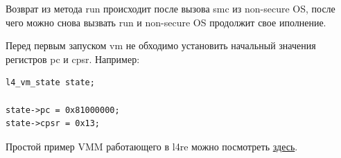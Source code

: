 \documentclass[11pt]{article}
\begin{document}
Возврат из метода run происходит после вызова smc из non-secure OS, после чего можно
снова вызвать run и non-secure OS продолжит свое иполнение.

Перед первым запуском vm не обходимо установить начальный значения регистров pc и 
cpsr. Например:
\begin{verbatim}
l4_vm_state state;

state->pc = 0x81000000;
state->cpsr = 0x13;
\end{verbatim}

Простой пример VMM работающего в l4re можно посмотреть \href{https://github.com/decaprox/l4re-snapshot/blob/020a76e63290159bcedc18b060108eab951be27e/src/l4/pkg/tz-vmm/server/src/main.cc}{здесь}.
\end{document}
